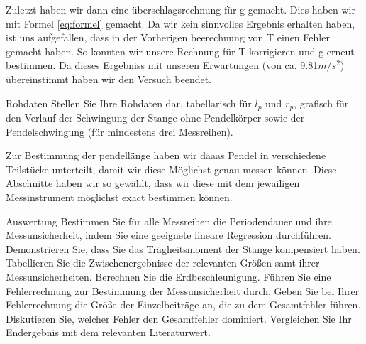 \documentclass[twoside]{protokoll}
\begin{document}
Zuletzt haben wir dann eine überschlagsrechnung für g gemacht. Dies haben wir mit Formel \ref{eq:formel} gemacht.
Da wir kein sinnvolles Ergebnis erhalten haben, ist uns aufgefallen, dass in der Vorherigen beerechnung von T einen Fehler gemacht haben. 
So konnten wir unsere Rechnung für T korrigieren und g erneut bestimmen. Da dieses Ergebniss mit unseren Erwartungen (von ca. 9.81$m/s^2$) übereinstimmt haben wir den Versuch beendet.

\begin{aufgabe}{Rohdaten}
  Stellen Sie Ihre Rohdaten dar, tabellarisch für $l_p$ und $r_p$,
  grafisch für den Verlauf der Schwingung der Stange ohne Pendelkörper
  sowie der Pendelschwingung (für mindestens drei Messreihen).
\end{aufgabe}

Zur Bestimmung der pendellänge haben wir daaas Pendel in verschiedene Teilstücke unterteilt, damit wir diese Möglichst genau messen können. 
Diese Abschnitte haben wir so gewählt, dass wir diese mit dem jewailigen Messinstrument möglichst exact bestimmen können. 



\begin{aufgabe}{Auswertung}
  Bestimmen Sie für alle Messreihen die Periodendauer und ihre
  Messunsicherheit, indem Sie eine geeignete lineare Regression
  durchführen. Demonstrieren Sie, dass Sie das Trägheitsmoment der
  Stange kompensiert haben. Tabellieren Sie die Zwischenergebnisse
  der relevanten Größen samt ihrer Messunsicherheiten. Berechnen
  Sie die Erdbeschleunigung. Führen Sie eine Fehlerrechnung zur
  Bestimmung der Messunsicherheit durch. Geben Sie bei Ihrer
  Fehlerrechnung die Größe der Einzelbeiträge an, die zu dem
  Gesamtfehler führen. Diskutieren Sie, welcher Fehler den
  Gesamtfehler dominiert. Vergleichen Sie Ihr Endergebnis mit dem
  relevanten Literaturwert.
\end{aufgabe}
\end{document}
